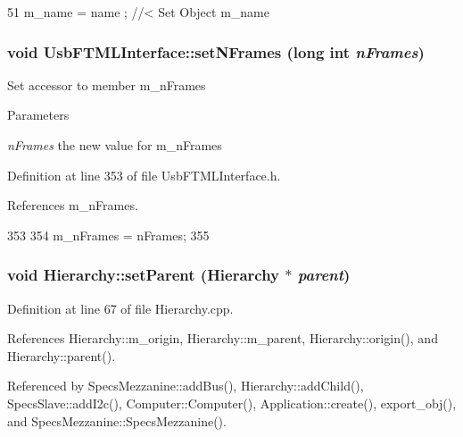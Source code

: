 \begin{DoxyCode}
51 { m_name  = name  ; } //< Set Object m_name
\end{DoxyCode}
\hypertarget{classUsbFTMLInterface_a3a0a9d323631790c2db210fdcc85e89b}{
\subsubsection[{setNFrames}]{\setlength{\rightskip}{0pt plus 5cm}void UsbFTMLInterface::setNFrames (long int {\em nFrames})}}
\label{classUsbFTMLInterface_a3a0a9d323631790c2db210fdcc85e89b}
Set accessor to member m\_\-nFrames 
\begin{DoxyParams}{Parameters}
\item[{\em nFrames}]the new value for m\_\-nFrames \end{DoxyParams}


Definition at line 353 of file UsbFTMLInterface.h.

References m\_\-nFrames.


\begin{DoxyCode}
353                                      {
354     m_nFrames = nFrames;
355   }
\end{DoxyCode}
\hypertarget{classHierarchy_a585ad1aeec16077a0e532ab8b4fc557b}{
\subsubsection[{setParent}]{\setlength{\rightskip}{0pt plus 5cm}void Hierarchy::setParent ({\bf Hierarchy} $\ast$ {\em parent})}}
\label{classHierarchy_a585ad1aeec16077a0e532ab8b4fc557b}


Definition at line 67 of file Hierarchy.cpp.

References Hierarchy::m\_\-origin, Hierarchy::m\_\-parent, Hierarchy::origin(), and Hierarchy::parent().

Referenced by SpecsMezzanine::addBus(), Hierarchy::addChild(), SpecsSlave::addI2c(), Computer::Computer(), Application::create(), export\_\-obj(), and SpecsMezzanine::SpecsMezzanine().


